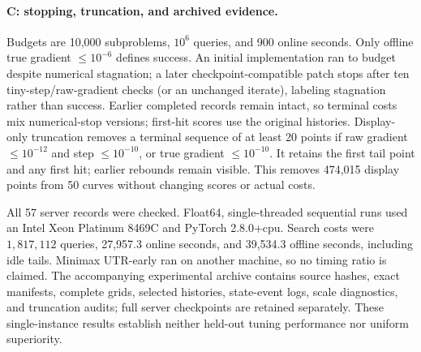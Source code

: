\paragraph{C: stopping, truncation, and archived evidence.}
\label{app:exp-c-stopping}
\label{app:exp-diagnostics}
Budgets are 10,000 subproblems, $10^6$ queries, and 900 online seconds.
Only offline true gradient $\le10^{-6}$ defines success. An initial
implementation ran to budget despite numerical stagnation; a later
checkpoint-compatible patch stops after ten tiny-step/raw-gradient
checks (or an unchanged iterate), labeling stagnation rather than
success. Earlier completed records remain intact, so terminal costs
mix numerical-stop versions; first-hit scores use the original histories.
Display-only truncation removes a terminal sequence of at least 20
points if raw gradient $\le10^{-12}$ and step $\le10^{-10}$, or true
gradient $\le10^{-10}$. It retains the first tail point and any first
hit; earlier rebounds remain visible. This removes 474,015 display
points from 50 curves without changing scores or actual costs.

All 57 server records were checked. Float64, single-threaded sequential
runs used an Intel Xeon Platinum 8469C and PyTorch 2.8.0+cpu. Search
costs were $1{,}817{,}112$ queries, 27,957.3 online seconds, and 39,534.3
offline seconds, including idle tails. Minimax UTR-early ran on another machine,
so no timing ratio is claimed. The accompanying experimental archive
contains source hashes, exact manifests, complete grids, selected histories,
state-event logs, scale diagnostics, and truncation audits; full server
checkpoints are retained separately. These
single-instance results establish neither held-out tuning performance
nor uniform superiority.
